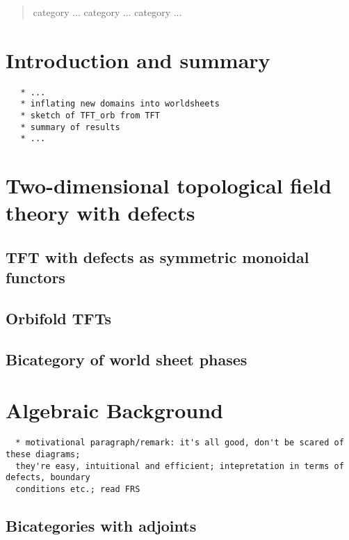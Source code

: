 \documentclass[12pt]{scrartcl}
\theoremstyle{definition}
\numberwithin{equation}{section}
\numberwithin{definition}{section}
\numberwithin{figure}{section}
\begin{document}
\begin{abstract}
category ... category ... category ...
\end{abstract}

\newpage

\tableofcontents


\section{Introduction and summary}\label{introduction}

\begin{verbatim}
   * ...
   * inflating new domains into worldsheets 
   * sketch of TFT_orb from TFT
   * summary of results
   * ...
\end{verbatim}

\section{Two-dimensional topological field theory with defects}

\subsection{TFT with defects as symmetric monoidal functors}

\subsection{Orbifold TFTs}

\subsection{Bicategory of world sheet phases}


\section{Algebraic Background}

\begin{verbatim}
  * motivational paragraph/remark: it's all good, don't be scared of these diagrams; 
  they're easy, intuitional and efficient; intepretation in terms of defects, boundary 
  conditions etc.; read FRS
\end{verbatim}


\subsection{Bicategories with adjoints}
\end{document}
